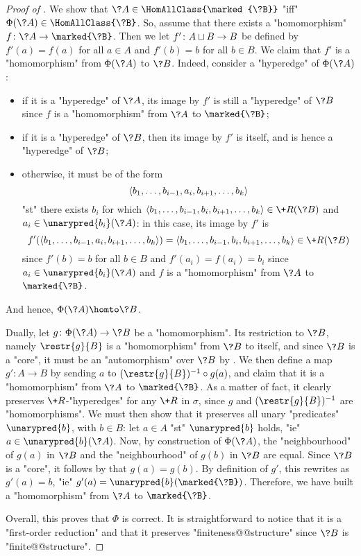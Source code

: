 \begin{proof}[Proof of ]
	We show that $\?A \in \HomAllClass{\marked{\?B}}$ "iff" $\Phi(\?A) \in \HomAllClass{\?B}$.
	So, assume that there exists a "homomorphism" $f\colon \?A \to \marked{\?B}$.
	Then we let $f'\colon A \sqcup B \to B$ be defined by $f'(a) = f(a)$ for all $a\in A$ and
	$f'(b) = b$ for all $b \in B$. We claim that $f'$ is a "homomorphism" from
	$\Phi(\?A)$ to $\?B$. Indeed, consider a "hyperedge" of $\Phi(\?A)$:
	\begin{itemize}
		\item if it is a "hyperedge" of $\?A$, its image by $f'$ is still a "hyperedge"
			of $\?B$ since $f$ is a "homomorphism" from $\?A$ to $\marked{\?B}$;
		\item if it is a "hyperedge" of $\?B$, then its image by $f'$ is itself, and is hence
			a "hyperedge" of $\?B$;
		\item otherwise, it must be of the form 
			\[\langle b_1,\hdots,b_{i-1}, a_i, b_{i+1},\hdots,b_k\rangle\]
			"st" there exists $b_i$ for which
			$\tup{b_1,\hdots,b_{i-1}, b_i, b_{i+1},\hdots,b_k} \in \+R(\?B)$
			and $a_i \in \unarypred{b_i}(\?A)$:
			in this case, its image by $f'$ is 
			\[f'(\tup{b_1,\hdots,b_{i-1}, a_i, b_{i+1},\hdots,b_k})
			= \tup{b_1,\hdots,b_{i-1}, b_i, b_{i+1},\hdots,b_k} \in \+R(\?B)\]
			since $f'(b) = b$ for all $b\in B$ and $f'(a_i) = f(a_i) = b_i$ since
			$a_i \in \unarypred{b_i}(\?A)$ and $f$ is a "homomorphism" from
			$\?A$ to $\marked{\?B}$.
	\end{itemize}
	And hence, $\Phi(\?A) \homto \?B$.

	Dually, let $g\colon \Phi(\?A) \to \?B$ be a "homomorphism".
	Its restriction to $\?B$, namely $\restr{g}{B}$ is a "homomorphism" from $\?B$
	to itself, and since $\?B$ is a "core", it must be an "automorphism" over $\?B$
	by .
	We then define a map $g' \colon A \to B$ by sending
	$a$ to $(\restr{g}{B})^{-1}\circ g(a)$, and claim that it is a "homomorphism"
	from $\?A$ to $\marked{\?B}$. As a matter of fact, it clearly preserves $\+R$-"hyperedges"
	for any $\+R$ in $\sigma$, since $g$ and $(\restr{g}{B})^{-1}$ are "homomorphisms".
	We must then show that it preserves all unary "predicates" $\unarypred{b}$, with $b\in B$:
	let $a \in A$ "st" $\unarypred{b}$ holds, "ie" $a \in \unarypred{b}(\?A)$.
	Now, by construction of $\Phi(\?A)$, the "neighbourhood" of $g(a)$ in $\?B$
	and the "neighbourhood" of $g(b)$ in $\?B$ are equal.
	Since $\?B$ is a "core", it follows by  that $g(a) = g(b)$.
	By definition of $g'$, this rewrites as $g'(a) = b$, "ie" $g'(a) = \unarypred{b}(\marked{\?B})$.
	Therefore, we have built a "homomorphism" from $\?A$ to $\marked{\?B}$.

	Overall, this proves that $\Phi$ is correct. It is straightforward to notice that
	it is a "first-order reduction" and that it preserves "finiteness@@structure" since $\?B$
	is "finite@@structure".
\end{proof}

